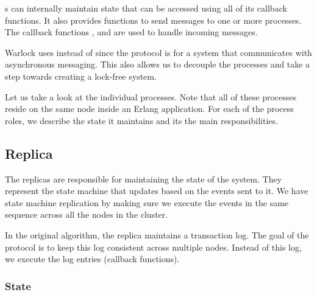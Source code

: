s can internally maintain state that can be accessed using
all of its
callback functions. It also provides functions to send messages%
to one or more processes. The callback functions %
, %
 and %
are used to handle incoming messages.

Warlock uses  instead of  since the
protocol is
for a system that communicates with asynchronous messaging. This also allows us
to decouple the processes and take a step towards creating a lock-free system.

Let us take a look at the individual  processes. Note
that all of these processes reside on the same node inside an
Erlang application. For each of the process roles, we describe the state
it maintains and its the main responsibilities.

\subsection{Replica}

The replicas are responsible for maintaining the state of the system. They
represent the state machine that updates based on the events sent to it. We
have state machine replication by making sure we execute the events in the same
sequence across all the nodes in the cluster.

In the original algorithm, the replica maintains a transaction log. The goal of
the protocol is to keep this log consistent across multiple nodes. Instead of
this log, we execute the log entries (callback functions).

\subsubsection{State}

